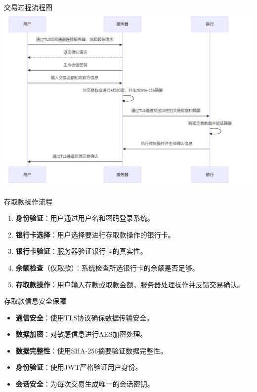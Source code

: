 \documentclass[]{beamer}
\begin{document}
    \begin{frame}{交易过程流程图}
        \includegraphics[width=1.0\textwidth]{bank.png}
    \end{frame}
    

    \begin{frame}{存取款操作流程}
        \begin{enumerate}
            \item \textbf{身份验证}：用户通过用户名和密码登录系统。
            \item \textbf{银行卡选择}：用户选择要进行存取款操作的银行卡。
            \item \textbf{银行卡验证}：服务器验证银行卡的真实性。
            \item \textbf{余额检查}（仅取款）：系统检查所选银行卡的余额是否足够。
            \item \textbf{存取款操作}：用户输入存款或取款金额，服务器处理操作并反馈交易确认。
        \end{enumerate}
    \end{frame}

    \begin{frame}{存取款信息安全保障}
        \begin{itemize}
            \item \textbf{通信安全}：使用TLS协议确保数据传输安全。
            \item \textbf{数据加密}：对敏感信息进行AES加密处理。
            \item \textbf{数据完整性}：使用SHA-256摘要验证数据完整性。
            \item \textbf{身份验证}：使用JWT严格验证用户身份。
            \item \textbf{会话安全}：为每次交易生成唯一的会话密钥。
        \end{itemize}
    \end{frame}
    
\end{document}
